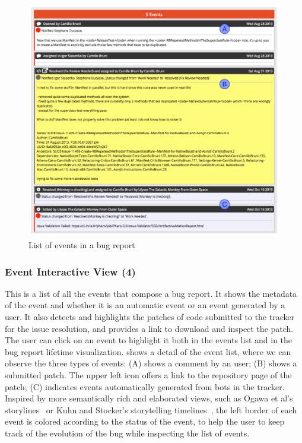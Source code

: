 \begin{figure}[t]
\centering
\includegraphics[width=.85\linewidth]{Images/visualize/event-list.pdf}
\caption{List of events in a bug report}
\label{fig:event-list}
\end{figure}

\subsubsection{Event Interactive View (4)}
This is a list of all the events that compose a bug report.
It shows the metadata of the event and whether it is an automatic event or an event generated by a user.
It also detects and highlights the patches of code submitted to the tracker for the issue resolution, and provides a link to download and inspect the patch.
The user can click on an event to highlight it both in the events list and in the bug report lifetime visualization.
 shows a detail of the event list, where we can observe the three types of events: (A) shows a comment by an user; (B) shows a submitted patch.
The upper left icon offers a link to the repository page of the patch; (C) indicates events automatically generated from bots in the tracker.
Inspired by more semantically rich and elaborated views, such as Ogawa et al's storylines~\cite{Ogaw2010a} or Kuhn and Stocker's storytelling timelines~\cite{Kuhn2012a}, the left border of each event is colored according to the status of the event, to help the user to keep track of the evolution of the bug while inspecting the list of events.

